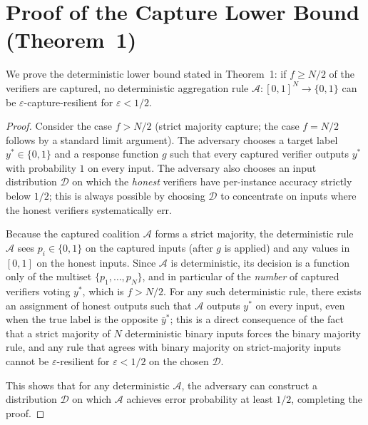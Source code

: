 \documentclass[11pt]{article}
\newcommand{\A}{\mathcal{A}}            %
\begin{document}



\appendix

\section{Proof of the Capture Lower Bound (Theorem~1)}
\label{app:proof}

We prove the deterministic lower bound stated in Theorem~1: if
$f \geq N/2$ of the verifiers are captured, no deterministic
aggregation rule $\mathcal{A}: [0,1]^N \to \{0,1\}$ can be
$\varepsilon$-capture-resilient for $\varepsilon < 1/2$.

\begin{proof}
Consider the case $f > N/2$ (strict majority capture; the case
$f = N/2$ follows by a standard limit argument). The adversary
chooses a target label $y^* \in \{0,1\}$ and a response function
$g$ such that every captured verifier outputs $y^*$ with
probability $1$ on every input. The adversary also chooses an input
distribution $\mathcal{D}$ on which the \emph{honest} verifiers have
per-instance accuracy strictly below $1/2$; this is always possible
by choosing $\mathcal{D}$ to concentrate on inputs where the honest
verifiers systematically err.

Because the captured coalition $\A$ forms a strict majority, the
deterministic rule $\mathcal{A}$ sees $p_i \in \{0, 1\}$ on the
captured inputs (after $g$ is applied) and any values in $[0,1]$ on
the honest inputs. Since $\mathcal{A}$ is deterministic, its
decision is a function only of the multiset $\{p_1, \ldots, p_N\}$,
and in particular of the \emph{number} of captured verifiers voting
$y^*$, which is $f > N/2$. For any such deterministic rule, there
exists an assignment of honest outputs such that $\mathcal{A}$ outputs
$y^*$ on every input, even when the true label is the opposite
$\bar{y}^*$; this is a direct consequence of the fact that a strict
majority of $N$ deterministic binary inputs forces the binary
majority rule, and any rule that agrees with binary majority on
strict-majority inputs cannot be $\varepsilon$-resilient for
$\varepsilon < 1/2$ on the chosen $\mathcal{D}$.

This shows that for any deterministic $\mathcal{A}$, the adversary
can construct a distribution $\mathcal{D}$ on which $\mathcal{A}$
achieves error probability at least $1/2$, completing the proof.
\end{proof}
\end{document}
